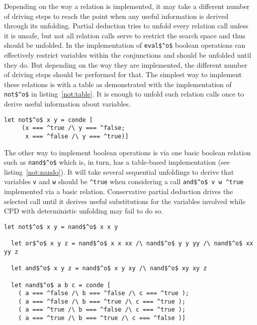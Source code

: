Depending on the way a relation is implemented, it may take a different number of driving steps to reach the point when any useful information is derived through its unfolding.
Partial deduction tries to unfold every relation call unless it is unsafe, but not all relation calls serve to restrict the search space and thus should be unfolded.
In the implementation of \lstinline{eval$^o$} boolean operations can effectively restrict variables within the conjunctions and should be unfolded until they do.
But depending on the way they are implemented, the different number of driving steps should be performed for that.
The simplest way to implement these relations is with a table as demonstrated with the implementation of \lstinline{not$^o$} in listing~\ref{not:table}.
It is enough to unfold such relation calls once to derive useful information about variables.

\begin{figure*}[!h]
  \centering
  \begin{minipage}{0.45\textwidth}
    \begin{lstlisting}[label={not:table}, caption={Implementation of boolean \lstinline{not} as a table}, captionpos=b, frame=tb]
  let not$^o$ x y = conde [
     (x === ^true /\ y === ^false;
      x === ^false /\ y === ^true)]
    \end{lstlisting}
  \end{minipage}
\end{figure*}

The other way to implement boolean operations is via one basic boolean relation such as \lstinline{nand$^o$} which is, in turn, has a table-based implementation (see listing~\ref{not:nando}).
It will take several sequential unfoldings to derive that variables \lstinline{v} and \lstinline{w} should be \lstinline{^true} when considering a call \lstinline{and$^o$ v w ^true} implemented via a basic relation.
Conservative partial deduction drives the selected call until it derives useful substitutions for the variables involved while CPD with deterministic unfolding may fail to do so.

\begin{figure*}[!h]
  \centering
  \begin{minipage}{0.85\textwidth}
    \begin{lstlisting}[label={not:nando}, caption={Implementation of boolean operation via \lstinline{nand}}, captionpos=b, frame=tb]
  let not$^o$ x y = nand$^o$ x x y

  let or$^o$ x y z = nand$^o$ x x xx /\ nand$^o$ y y yy /\ nand$^o$ xx yy z

  let and$^o$ x y z = nand$^o$ x y xy /\ nand$^o$ xy xy z

  let nand$^o$ a b c = conde [
    ( a === ^false /\ b === ^false /\ c === ^true );
    ( a === ^false /\ b === ^true /\ c === ^true );
    ( a === ^true /\ b === ^false /\ c === ^true );
    ( a === ^true /\ b === ^true /\ c === ^false )]
    \end{lstlisting}
  \end{minipage}
\end{figure*}

